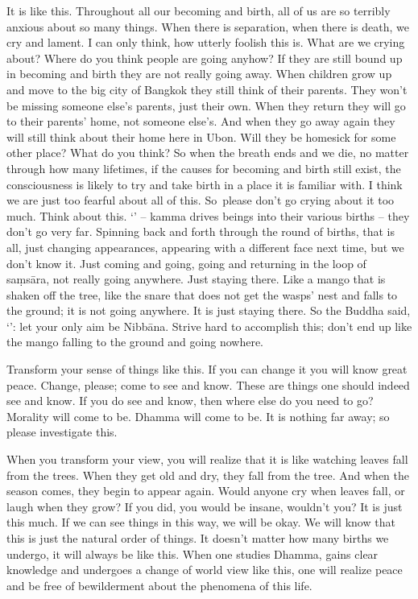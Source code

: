 It is like this. Throughout all our becoming and birth, all of us are so terribly anxious about so many things. When there is separation, when there is death, we cry and lament. I can only think, how utterly foolish this is. What are we crying about? Where do you think people are going anyhow? If they are still bound up in becoming and birth they are not really going away. When children grow up and move to the big city of Bangkok they still think of their parents. They won't be missing someone else's parents, just their own. When they return they will go to their parents' home, not someone else's. And when they go away again they will still think about their home here in Ubon. Will they be homesick for some other place? What do you think? So when the breath ends and we die, no matter through how many lifetimes, if the causes for becoming and birth still exist, the consciousness is likely to try and take birth in a place it is familiar with. I think we are just too fearful about all of this. \mbox{So please} don't go crying about it too much. Think about this. `' -- kamma drives beings into their various births -- they don't go very far. Spinning back and forth through the round of births, that is all, just changing appearances, appearing with a different face next time, but we don't know it. Just coming and going, going and returning in the loop of sa\d{m}s\=ara, not really going anywhere. Just staying there. Like a mango that is shaken off the tree, like the snare that does not get the wasps' nest and falls to the ground; it is not going anywhere. It is just staying there. So the Buddha said, `': let your only aim be Nibb\=ana. Strive hard to accomplish this; don't end up like the mango falling to the ground and going nowhere. 

Transform your sense of things like this. If you can change it you will know great peace. Change, please; come to see and know. These are things one should indeed see and know. If you do see and know, then where else do you need to go? Morality will come to be. Dhamma will come to be. It is nothing far away; so please investigate this. 

When you transform your view, you will realize that it is like watching leaves fall from the trees. When they get old and dry, they fall from the tree. And when the season comes, they begin to appear again. Would anyone cry when leaves fall, or laugh when they grow? If you did, you would be insane, wouldn't you? It is just this much. If we can see things in this way, we will be okay. We will know that this is just the natural order of things. It doesn't matter how many births we undergo, it will always be like this. When one studies Dhamma, gains clear knowledge and undergoes a change of world view like this, one will realize peace and be free of bewilderment about the phenomena of this life. 

